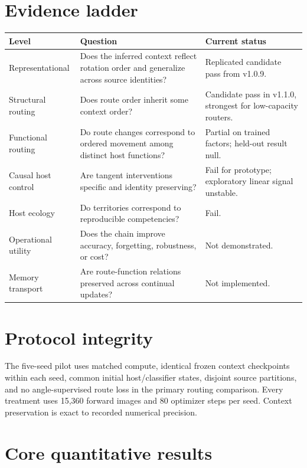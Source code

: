 \documentclass[11pt,a4paper]{article}
\begin{document}
\section{Evidence ladder}
\begin{table}[H]\centering\small
\begin{tabularx}{\textwidth}{lYY}
\toprule
Level & Question & Current status\\\midrule
Representational & Does the inferred context reflect rotation order and generalize across source identities? & Replicated candidate pass from v1.0.9.\\
Structural routing & Does route order inherit some context order? & Candidate pass in v1.1.0, strongest for low-capacity routers.\\
Functional routing & Do route changes correspond to ordered movement among distinct host functions? & Partial on trained factors; held-out result null.\\
Causal host control & Are tangent interventions specific and identity preserving? & Fail for prototype; exploratory linear signal unstable.\\
Host ecology & Do territories correspond to reproducible competencies? & Fail.\\
Operational utility & Does the chain improve accuracy, forgetting, robustness, or cost? & Not demonstrated.\\
Memory transport & Are route-function relations preserved across continual updates? & Not implemented.\\
\bottomrule
\end{tabularx}
\end{table}

\section{Protocol integrity}
The five-seed pilot uses matched compute, identical frozen context checkpoints within each seed, common initial host/classifier states, disjoint source partitions, and no angle-supervised route loss in the primary routing comparison. Every treatment uses 15,360 forward images and 80 optimizer steps per seed. Context preservation is exact to recorded numerical precision.

\section{Core quantitative results}
\end{document}

